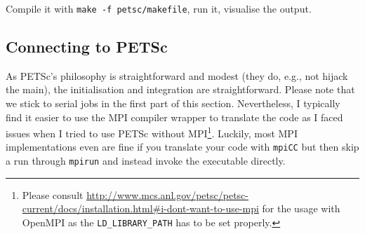 \noindent
Compile it with \texttt{make -f petsc/makefile}, run it, visualise the output.


\subsection{Connecting to PETSc}

As PETSc's philosophy is straightforward and modest (they do, e.g.,
not hijack the main), the initialisation and integration are straightforward.
Please note that we stick to serial jobs in the first part of this
section.
Nevertheless, I typically find it easier to use 
the MPI compiler wrapper to translate the code as I faced
issues when I tried to use PETSc without MPI\footnote{Please consult
\url{http://www.mcs.anl.gov/petsc/petsc-current/docs/installation.html\#i-dont-want-to-use-mpi}
for the usage with OpenMPI as the \texttt{LD\_LIBRARY\_PATH} has to be set
properly.}.
Luckily, most MPI implementations even are fine if you translate your code with
\texttt{mpiCC} but then skip a run through \texttt{mpirun} and instead invoke
the executable directly.


